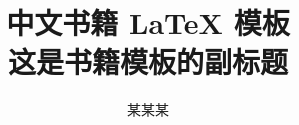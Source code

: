 \documentclass[openany,twoside,zihao=-4]{zhbook}
\title{中文书籍 \LaTeX{} 模板  \\[10pt] \zihao{2} 这是书籍模板的副标题}
\institute{某某大学}
\author{某某某}  %
\begin{document}
\maketitle

%



\frontmatter














\maketoc

\makelof

\makelot






\mainmatter


















\end{document}
